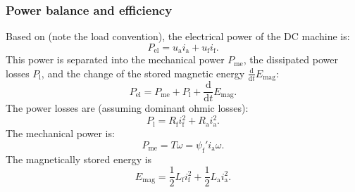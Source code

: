 \begin{frame}
	\frametitle{Power balance and efficiency}
	Based on  (note the load convention), the electrical power of the DC machine is:
	\begin{equation}
		P_\mathrm{el} = u_\mathrm{a} i_\mathrm{a} + u_\mathrm{f} i_\mathrm{f}.
	\end{equation} \pause
	This power is separated into the mechanical power $P_\mathrm{me}$, the dissipated power losses $P_\mathrm{l}$, and the change of the stored magnetic energy $\frac{\mathrm{d}}{\mathrm{d}t}E_\mathrm{mag}$:
	\begin{equation}
		P_\mathrm{el} = P_\mathrm{me} + P_\mathrm{l} + \frac{\mathrm{d}}{\mathrm{d}t}E_\mathrm{mag}.
	\end{equation} \pause
	The power losses are (assuming dominant ohmic losses):
	\begin{equation}
		P_\mathrm{l} = R_\mathrm{f} i_\mathrm{f}^2 + R_\mathrm{a} i_\mathrm{a}^2.
	\end{equation} \pause
	The mechanical power is:
	\begin{equation}
		P_\mathrm{me} = T \omega = \psi_\mathrm{f}' i_\mathrm{a} \omega.
	\end{equation} \pause
	The magnetically stored energy is
	\begin{equation}
		E_\mathrm{mag} = \frac{1}{2} L_\mathrm{f} i_\mathrm{f}^2 + \frac{1}{2} L_\mathrm{a} i_\mathrm{a}^2.
	\end{equation}
\end{frame}

